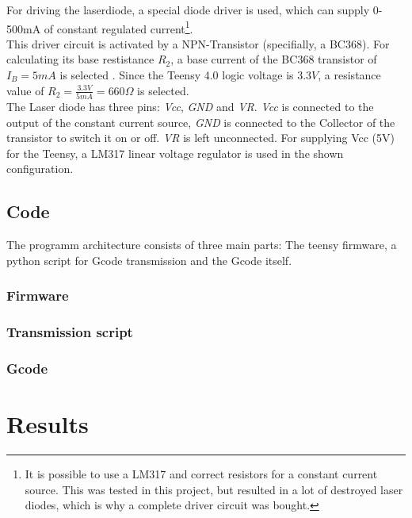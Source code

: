 \documentclass[a4paper, 11pt]{scrartcl}
\begin{document}
For driving the laserdiode, a special diode driver is used, which can supply 0-500mA of constant regulated current\footnote{It is possible to use a LM317 and correct resistors for a constant current source. This was tested in this project, but resulted in a lot of destroyed laser diodes, which is why a complete driver circuit was bought.}. \\
This driver circuit is activated by a NPN-Transistor (specifially, a BC368). For calculating its base restistance $R_2$, a base current of the BC368 transistor of $I_B=5mA$ is selected \cite[p. 3]{SemiconductorComponentsIndustries.2007}. Since the Teensy 4.0 logic voltage is $3.3V$, a resistance value of $R_2=\frac{3.3V}{5mA}=660\Omega$ is selected. \\
The Laser diode has three pins: \textit{Vcc}, \textit{GND} and \textit{VR}. \textit{Vcc} is connected to the output of the constant current source, \textit{GND} is connected to the Collector of the transistor to switch it on or off. \textit{VR} is left unconnected. 
For supplying Vcc (5V) for the Teensy, a LM317 linear voltage regulator is used in the shown configuration. 
\subsection{Code}
The programm architecture consists of three main parts: The teensy firmware, a python script for Gcode transmission and the Gcode itself. 
\subsubsection{Firmware}
\subsubsection{Transmission script}
\subsubsection{Gcode}
\section{Results}
 

\end{document}

